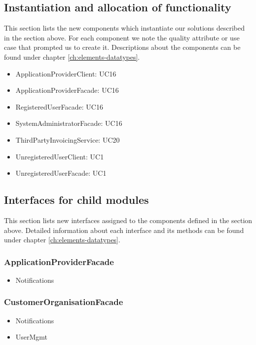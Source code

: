 \subsection{Instantiation and allocation of functionality}
    This section lists the new components which instantiate our solutions
    described in the section above. For each component we note the quality
    attribute or use case that prompted us to create it. Descriptions about
    the components can be found under chapter \ref{ch:elements-datatypes}. \\

    \begin{itemize}
        \item ApplicationProviderClient: UC16
        \item ApplicationProviderFacade: UC16
        \item RegisteredUserFacade: UC16
        \item SystemAdministratorFacade: UC16
        \item ThirdPartyInvoicingService: UC20
        \item UnregisteredUserClient: UC1
        \item UnregisteredUserFacade: UC1
    \end{itemize}


\subsection{Interfaces for child modules}
    This section lists new interfaces assigned to the components defined
    in the section above. Detailed information about each interface and
    its methods can be found under chapter \ref{ch:elements-datatypes}.

    \subsubsection{ApplicationProviderFacade}
        \begin{itemize}
            \item Notifications
        \end{itemize}

    \subsubsection{CustomerOrganisationFacade}
        \begin{itemize}
            \item Notifications
            \item UserMgmt
        \end{itemize}

